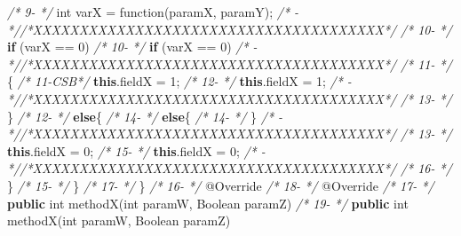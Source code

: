 \documentclass[
]{article}
\newenvironment{Shaded}{\begin{snugshade}}{\end{snugshade}}
\newcommand{\AttributeTok}[1]{\textcolor[rgb]{0.77,0.63,0.00}{#1}}
\newcommand{\BuiltInTok}[1]{#1}
\newcommand{\CommentTok}[1]{\textcolor[rgb]{0.56,0.35,0.01}{\textit{#1}}}
\newcommand{\DataTypeTok}[1]{\textcolor[rgb]{0.13,0.29,0.53}{#1}}
\newcommand{\DecValTok}[1]{\textcolor[rgb]{0.00,0.00,0.81}{#1}}
\newcommand{\FunctionTok}[1]{\textcolor[rgb]{0.00,0.00,0.00}{#1}}
\newcommand{\KeywordTok}[1]{\textcolor[rgb]{0.13,0.29,0.53}{\textbf{#1}}}
\newcommand{\NormalTok}[1]{#1}
\begin{document}
\begin{Shaded}
\begin{Highlighting}[]
\CommentTok{/*  9-   */}        \DataTypeTok{int}\NormalTok{ varX = }\FunctionTok{function}\NormalTok{(paramX, paramY);             }\CommentTok{/*   -   *//*XXXXXXXXXXXXXXXXXXXXXXXXXXXXXXXXXXXXXX*/}               
\CommentTok{/* 10-   */}        \KeywordTok{if}\NormalTok{ (varX == }\DecValTok{0}\NormalTok{)                                   }\CommentTok{/* 10-   */}        \KeywordTok{if}\NormalTok{ (varX == }\DecValTok{0}\NormalTok{)                                   }
\CommentTok{/*   -   *//*XXXXXXXXXXXXXXXXXXXXXXXXXXXXXXXXXXXXXX*/}               \CommentTok{/* 11-   */}\NormalTok{        \{                                                }
\CommentTok{/* 11-CSB*/}            \KeywordTok{this}\NormalTok{.}\FunctionTok{fieldX}\NormalTok{ = }\DecValTok{1}\NormalTok{;                             }\CommentTok{/* 12-   */}            \KeywordTok{this}\NormalTok{.}\FunctionTok{fieldX}\NormalTok{ = }\DecValTok{1}\NormalTok{;                             }
\CommentTok{/*   -   *//*XXXXXXXXXXXXXXXXXXXXXXXXXXXXXXXXXXXXXX*/}               \CommentTok{/* 13-   */}\NormalTok{        \}                                                            }
\CommentTok{/* 12-   */}        \KeywordTok{else}\NormalTok{\{                                            }\CommentTok{/* 14-   */}        \KeywordTok{else}\NormalTok{\{                                            }
\CommentTok{/* 14-   */}\NormalTok{     \}                                                        }\CommentTok{/*   -   *//*XXXXXXXXXXXXXXXXXXXXXXXXXXXXXXXXXXXXXX*/}               
\CommentTok{/* 13-   */}            \KeywordTok{this}\NormalTok{.}\FunctionTok{fieldX}\NormalTok{ = }\DecValTok{0}\NormalTok{;                             }\CommentTok{/* 15-   */}            \KeywordTok{this}\NormalTok{.}\FunctionTok{fieldX}\NormalTok{ = }\DecValTok{0}\NormalTok{;                             }
\CommentTok{/*   -   *//*XXXXXXXXXXXXXXXXXXXXXXXXXXXXXXXXXXXXXX*/}               \CommentTok{/* 16-   */}\NormalTok{        \}                                                }
\CommentTok{/* 15-   */}\NormalTok{    \}                                                    }\CommentTok{/* 17-   */}\NormalTok{    \}                                                    }
\CommentTok{/* 16-   */}    \AttributeTok{@Override}                                            \CommentTok{/* 18-   */}    \AttributeTok{@Override}                                            
\CommentTok{/* 17-   */}    \KeywordTok{public} \DataTypeTok{int} \FunctionTok{methodX}\NormalTok{(}\DataTypeTok{int}\NormalTok{ paramW, }\BuiltInTok{Boolean}\NormalTok{ paramZ)       }\CommentTok{/* 19-   */}    \KeywordTok{public} \DataTypeTok{int} \FunctionTok{methodX}\NormalTok{(}\DataTypeTok{int}\NormalTok{ paramW, }\BuiltInTok{Boolean}\NormalTok{ paramZ)       }

\end{Highlighting}
\end{Shaded}
\end{document}
